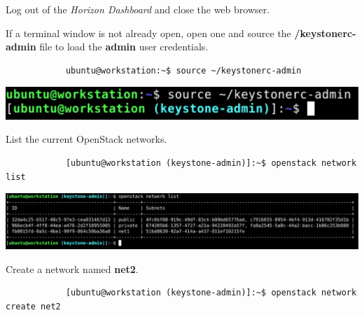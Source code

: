 \documentclass[letterpaper, 12pt]{article}
\begin{document}
\begin{enumerate}
    \begin{labstep}
        Log out of the \textit{Horizon Dashboard} and close the web browser.
    \end{labstep}

    \begin{labstep}
        If a terminal window is not already open, open one and source the \textbf{\texttildemid/keystonerc-admin} file to load the \textbf{admin} user credentials.
        \begin{lstlisting}
            ubuntu@workstation:~$ source ~/keystonerc-admin
        \end{lstlisting}

        \begin{center}
            \includegraphics[width=\linewidth]{images/part3/step9.png}
        \end{center}
    \end{labstep}

    \begin{labstep}
        List the current OpenStack networks.
        \begin{lstlisting}
            [ubuntu@workstation (keystone-admin)]:~$ openstack network list
        \end{lstlisting}

        \begin{center}
            \includegraphics[width=\linewidth]{images/part3/step10.png}
        \end{center}
    \end{labstep}

    \begin{labstep}
        Create a network named \textbf{net2}.
        \begin{lstlisting}
            [ubuntu@workstation (keystone-admin)]:~$ openstack network create net2
        \end{lstlisting}


\end{labstep}
\end{enumerate}
\end{document}

